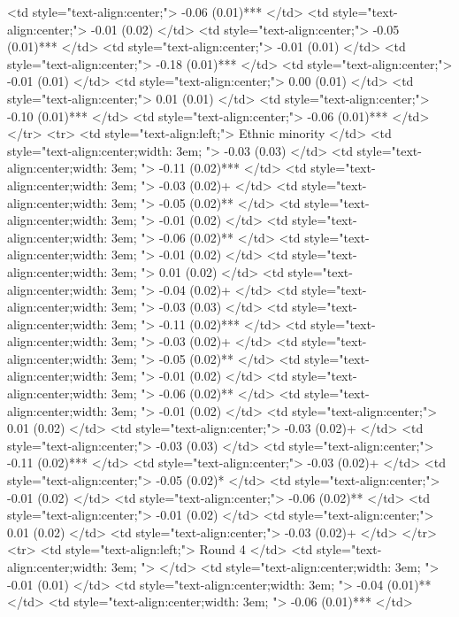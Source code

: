    <td style="text-align:center;"> -0.06 (0.01)*** </td>
   <td style="text-align:center;"> -0.01 (0.02) </td>
   <td style="text-align:center;"> -0.05 (0.01)*** </td>
   <td style="text-align:center;"> -0.01 (0.01) </td>
   <td style="text-align:center;"> -0.18 (0.01)*** </td>
   <td style="text-align:center;"> -0.01 (0.01) </td>
   <td style="text-align:center;"> 0.00 (0.01) </td>
   <td style="text-align:center;"> 0.01 (0.01) </td>
   <td style="text-align:center;"> -0.10 (0.01)*** </td>
   <td style="text-align:center;"> -0.06 (0.01)*** </td>
  </tr>
  <tr>
   <td style="text-align:left;"> Ethnic minority </td>
   <td style="text-align:center;width: 3em; "> -0.03 (0.03) </td>
   <td style="text-align:center;width: 3em; "> -0.11 (0.02)*** </td>
   <td style="text-align:center;width: 3em; "> -0.03 (0.02)+ </td>
   <td style="text-align:center;width: 3em; "> -0.05 (0.02)** </td>
   <td style="text-align:center;width: 3em; "> -0.01 (0.02) </td>
   <td style="text-align:center;width: 3em; "> -0.06 (0.02)** </td>
   <td style="text-align:center;width: 3em; "> -0.01 (0.02) </td>
   <td style="text-align:center;width: 3em; "> 0.01 (0.02) </td>
   <td style="text-align:center;width: 3em; "> -0.04 (0.02)+ </td>
   <td style="text-align:center;width: 3em; "> -0.03 (0.03) </td>
   <td style="text-align:center;width: 3em; "> -0.11 (0.02)*** </td>
   <td style="text-align:center;width: 3em; "> -0.03 (0.02)+ </td>
   <td style="text-align:center;width: 3em; "> -0.05 (0.02)** </td>
   <td style="text-align:center;width: 3em; "> -0.01 (0.02) </td>
   <td style="text-align:center;width: 3em; "> -0.06 (0.02)** </td>
   <td style="text-align:center;width: 3em; "> -0.01 (0.02) </td>
   <td style="text-align:center;"> 0.01 (0.02) </td>
   <td style="text-align:center;"> -0.03 (0.02)+ </td>
   <td style="text-align:center;"> -0.03 (0.03) </td>
   <td style="text-align:center;"> -0.11 (0.02)*** </td>
   <td style="text-align:center;"> -0.03 (0.02)+ </td>
   <td style="text-align:center;"> -0.05 (0.02)* </td>
   <td style="text-align:center;"> -0.01 (0.02) </td>
   <td style="text-align:center;"> -0.06 (0.02)** </td>
   <td style="text-align:center;"> -0.01 (0.02) </td>
   <td style="text-align:center;"> 0.01 (0.02) </td>
   <td style="text-align:center;"> -0.03 (0.02)+ </td>
  </tr>
  <tr>
   <td style="text-align:left;"> Round 4 </td>
   <td style="text-align:center;width: 3em; ">  </td>
   <td style="text-align:center;width: 3em; "> -0.01 (0.01) </td>
   <td style="text-align:center;width: 3em; "> -0.04 (0.01)** </td>
   <td style="text-align:center;width: 3em; "> -0.06 (0.01)*** </td>

